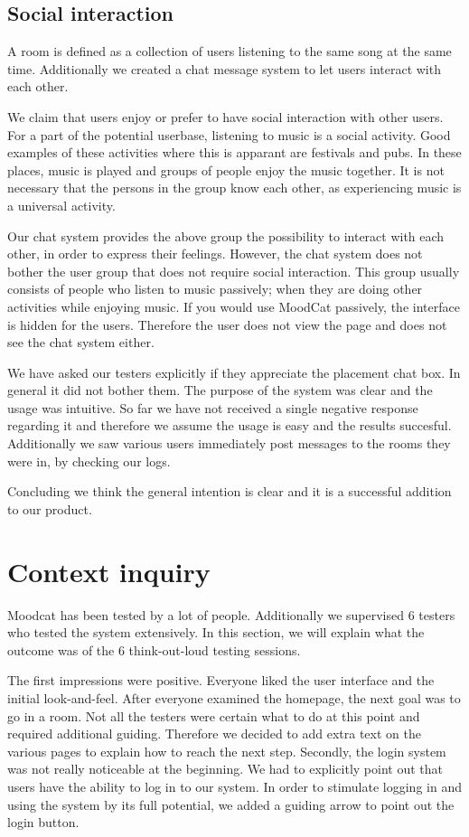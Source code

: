 \subsection{Social interaction}

A room is defined as a collection of users listening to the same song at the same time.
Additionally we created a chat message system to let users interact with each other.

We claim that users enjoy or prefer to have social interaction with other users.
For a part of the potential userbase, listening to music is a social activity.
Good examples of these activities where this is apparant are festivals and pubs.
In these places, music is played and groups of people enjoy the music together.
It is not necessary that the persons in the group know each other, as experiencing music is a universal activity.

Our chat system provides the above group the possibility to interact with each other, in order to express their feelings.
However, the chat system does not bother the user group that does not require social interaction.
This group usually consists of people who listen to music passively; when they are doing other activities while enjoying music.
If you would use MoodCat passively, the interface is hidden for the users.
Therefore the user does not view the page and does not see the chat system either.

We have asked our testers explicitly if they appreciate the placement chat box.
In general it did not bother them.
The purpose of the system was clear and the usage was intuitive.
So far we have not received a single negative response regarding it and therefore we assume the usage is easy and the results succesful.
Additionally we saw various users immediately post messages to the rooms they were in, by checking our logs.

Concluding we think the general intention is clear and it is a successful addition to our product.

\section{Context inquiry}
Moodcat has been tested by a lot of people.
Additionally we supervised 6 testers who tested the system extensively.
In this section, we will explain what the outcome was of the 6 think-out-loud testing sessions.

The first impressions were positive.
Everyone liked the user interface and the initial look-and-feel.
After everyone examined the homepage, the next goal was to go in a room.
Not all the testers were certain what to do at this point and required additional guiding.
Therefore we decided to add extra text on the various pages to explain how to reach the next step.
Secondly, the login system was not really noticeable at the beginning.
We had to explicitly point out that users have the ability to log in to our system.
In order to stimulate logging in and using the system by its full potential, we added a guiding arrow to point out the login button.

